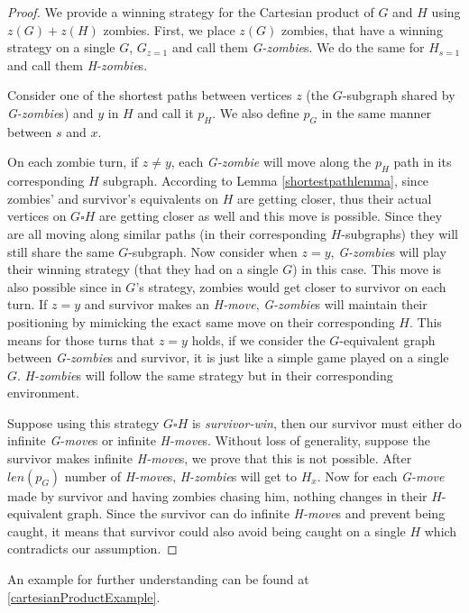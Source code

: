 \documentclass[1p]{elsarticle}
\begin{document}
\begin{proof}
	We provide a winning strategy for the Cartesian product of $G$ and $H$ using $z(G)+z(H)$ zombies. First, we place
	$z(G)$ zombies, that have a winning strategy on a single $G$, $G_{z = 1}$ and call them {\it G-zombie}s. We do the
	same for $H_{s = 1}$ and call them {\it H-zombie}s.


	Consider one of the shortest paths between vertices $z$ (the $G$-subgraph shared by {\it G-zombie}s) and $y$ in $H$
	and call it $p_H$. We also define $p_G$ in the same manner between $s$ and $x$.


	On each zombie turn, if $z \neq y$, each {\it G-zombie} will move along the $p_H$ path in its corresponding $H$
	subgraph. According to Lemma \ref{shortestpathlemma}, since zombies' and survivor's equivalents on $H$ are getting
	closer, thus their actual vertices on $G \square H$ are getting closer as well and this move is possible. Since they
	are all moving along similar paths (in their corresponding $H$-subgraphs) they will still share the same
	$G$-subgraph. Now consider when $z = y$, {\it G-zombie}s will play their winning strategy (that they had on a single
	$G$) in this case. This move is also possible since in $G$'s strategy, zombies would get closer to survivor on each
	turn. If $z = y$ and survivor makes an {\it H-move}, {\it G-zombie}s will maintain their positioning by mimicking
	the exact same move on their corresponding $H$. This means for those turns that $z=y$ holds, if we consider the
	$G$-equivalent graph between {\it G-zombie}s and survivor, it is just like a simple game played on a single $G$.
	{\it H-zombie}s will follow the same strategy but in their corresponding environment.
	
	
	Suppose using this strategy $G \square H$ is {\it survivor-win}, then our survivor must either do infinite {\it
	G-move}s or infinite {\it H-move}s. Without loss of generality, suppose the survivor makes infinite {\it H-move}s,
	we prove that this is not possible. After $len(p_G)$ number of {\it H-move}s, {\it H-zombie}s will get to $H_x$. Now for
	each {\it G-move} made by survivor and having zombies chasing him, nothing changes in their $H$-equivalent graph.
	Since the survivor can do infinite {\it H-move}s and prevent being caught, it means that survivor could also avoid
	being caught on a single $H$ which contradicts our assumption.
	
\end{proof}
An example for further understanding can be found at \ref{cartesianProductExample}.
\end{document}
